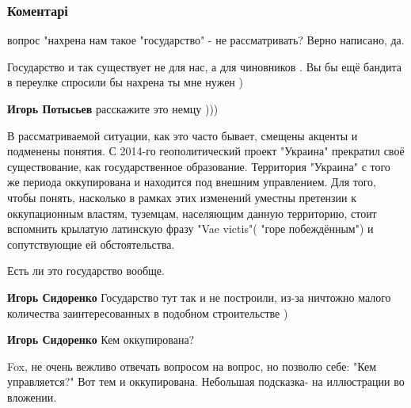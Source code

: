  
 
 
 
 
\subsubsection{Коментарі}
\label{sec:25_03_2020.fb.lesev_igor.1.medicina_ukraina_dlja_izbrannyh.cmt}

\begin{itemize} %

вопрос "нахрена нам такое "государство" - не рассматривать?
Верно написано, да.

\begin{itemize} %

Государство и так существует не для нас, а для чиновников . Вы бы ещё бандита в
переулке спросили бы нахрена ты мне нужен )

\textbf{Игорь Потысьев} расскажите это немцу )))


В рассматриваемой ситуации, как это часто бывает, смещены акценты и подменены
понятия. С 2014-го геополитический проект "Украина" прекратил своё
существование, как государственное образование. Территория "Украина" с того же
периода оккупирована и находится под внешним управлением. Для того, чтобы
понять, насколько в рамках этих изменений уместны претензии к оккупационным
властям, туземцам, населяющим данную территорию, стоит вспомнить крылатую
латинскую фразу "Vae victis"( "горе побеждённым") и сопутствующие ей
обстоятельства.

Есть ли это государство вообще.

\textbf{Игорь Сидоренко} Государство тут так и не построили, из-за ничтожно малого количества заинтересованных в подобном строительстве )

\textbf{Игорь Сидоренко} Кем оккупирована?


Fox, не очень вежливо отвечать вопросом на вопрос, но позволю себе: "Кем
управляется?" Вот тем и оккупирована. Небольшая подсказка- на иллюстрации во
вложении.


\end{itemize}
\end{itemize}
